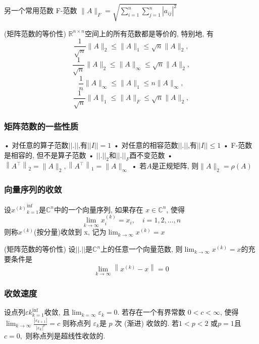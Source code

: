 \documentclass[12pt,a4paper]{article}
\begin{document}
另一个常用范数 F-范数 $\|A\|_{F}=\sqrt{\sum_{i=1}^{n} \sum_{j=1}^{n}\left|a_{i j}\right|^{2}}$

\begin{framed}
	\begin{theorem}(矩阵范数的等价性)
		$\mathbb{R}^{n×n}$空间上的所有范数都是等价的, 特别地, 有
		$$
		\frac{1}{\sqrt{n}}\|A\|_{2} \leq\|A\|_{1} \leq \sqrt{n}\|A\|_{2},
		$$
		$$
		\frac{1}{\sqrt{n}}\|A\|_{2} \leq\|A\|_{\infty} \leq \sqrt{n}\|A\|_{2},
		$$
		$$
		\frac{1}{n}\|A\|_{\infty} \leq\|A\|_{1} \leq n\|A\|_{\infty}
,
		$$
		$$
		\frac{1}{\sqrt{n}}\|A\|_{1} \leq\|A\|_{F} \leq \sqrt{n}\|A\|_{2}
,
		$$
	\end{theorem}
\end{framed}

\subsubsection{矩阵范数的一些性质}
• 对任意的算子范数$||.||$,有$||I|| = 1$
• 对任意的相容范数$||.||$,有$||I|| \leq 1$ 
• F-范数是相容的, 但不是算子范数
• $||.||_2$和$||.||_F$酉不变范数
• $\left\|A^{\top}\right\|_{2}=\|A\|_{2},\left\|A^{\top}\right\|_{1}=\|A\|_{\infty}$
• 若$A$是正规矩阵, 则$\|A\|_{2}=\rho(A)$

\subsubsection{向量序列的收敛}
设${x^{(k)}}^{\inf}_{
k=1}$是$\mathbb{C}^n $中的一个向量序列, 如果存在 $x ∈ \mathbb{C}^n$, 使得
$$
\lim _{k \rightarrow \infty} x_{i}^{(k)}=x_{i}, \quad i=1,2, \ldots, n
$$
则称${x^{(k)}}$(按分量)收敛到 x, 记为$\lim _{k \rightarrow \infty} x^{(k)}=x$

\begin{framed}
	\begin{theorem}(矩阵范数的等价性)
		设$||.||$是$\mathbb{C}^{n}$上的任意一个向量范数, 则$\lim _{k \rightarrow \infty} x^{(k)}=x$的充要条件是
		$$
		\lim _{k \rightarrow \infty}\left\|x^{(k)}-x\right\|=0
		$$
	\end{theorem}
\end{framed}

\subsubsection{收敛速度}
设点列${εk}_{k=1}^{\inf}$收敛, 且$\lim _{k=\infty} \varepsilon_{k}=0$. 若存在一个有界常数 $0 < c < ∞$, 使得
$\lim _{k \rightarrow \infty} \frac{\left|\varepsilon_{k+1}\right|}{\left|\varepsilon_{k}\right|^{p}}=c$
则称点列 ${ε_k} $是 $p$ 次 (渐进) 收敛的. 若$ 1 < p < 2$ 或$ p = 1 $且 $c = 0,$ 则称点列是超线性收敛的.
\end{document}
